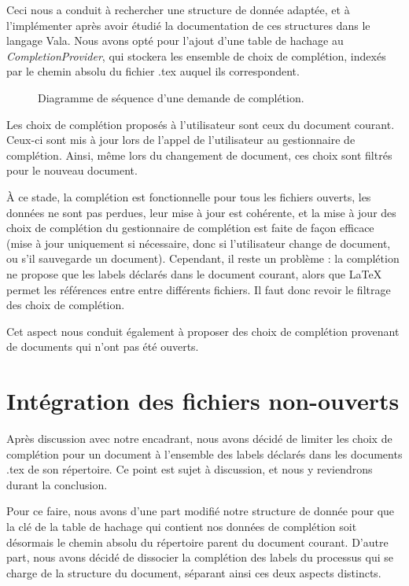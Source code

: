 \documentclass[a4paper,11pt]{report}
\begin{document}
Ceci nous a conduit à rechercher une structure de donnée adaptée, et à l'implémenter après avoir étudié la documentation de ces structures dans le langage Vala.
Nous avons opté pour l'ajout d'une table de hachage au \textit{CompletionProvider}, qui stockera les ensemble de choix de complétion, indexés par le chemin absolu du fichier .tex auquel ils correspondent.

\begin{figure}[h]
\label{fig:filtering_completion}
\centering

\caption{Diagramme de séquence d'une demande de complétion.}
\end{figure}

Les choix de complétion proposés à l'utilisateur sont ceux du document courant.
Ceux-ci sont mis à jour lors de l'appel de l'utilisateur au gestionnaire de complétion. Ainsi, même lors du changement de document, ces choix sont filtrés pour le nouveau document.

À ce stade, la complétion est fonctionnelle pour tous les fichiers ouverts, les données ne sont pas perdues, leur mise à jour est cohérente, et la mise à jour des choix de complétion du gestionnaire de complétion est faite de façon efficace (mise à jour uniquement si nécessaire, donc si l'utilisateur change de document, ou s'il sauvegarde un document).
Cependant, il reste un problème : la complétion ne propose que les labels déclarés dans le document courant, alors que \LaTeX{} permet les références entre entre différents fichiers.
Il faut donc revoir le filtrage des choix de complétion.

Cet aspect nous conduit également à proposer des choix de complétion provenant de documents qui n'ont pas été ouverts.

\section{Intégration des fichiers non-ouverts}
Après discussion avec notre encadrant, nous avons décidé de limiter les choix de complétion pour un document à l'ensemble des labels déclarés dans les documents .tex de son répertoire.
Ce point est sujet à discussion, et nous y reviendrons durant la conclusion.

Pour ce faire, nous avons d'une part modifié notre structure de donnée pour que la clé de la table de hachage qui contient nos données de complétion soit désormais le chemin absolu du répertoire parent du document courant.
D'autre part, nous avons décidé de dissocier la complétion des labels du processus qui se charge de la structure du document, séparant ainsi ces deux aspects distincts.
\end{document}
